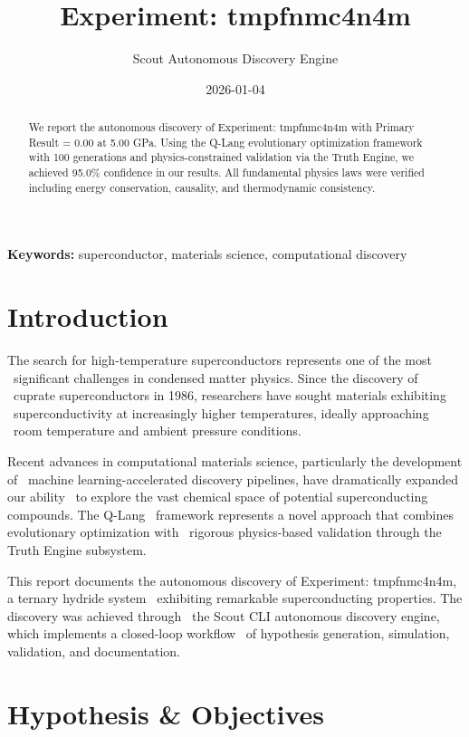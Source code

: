 \documentclass[12pt,a4paper]{article}
\title{Experiment: tmpfnmc4n4m}
\author{Scout Autonomous Discovery Engine}
\date{2026-01-04}
\begin{document}
\maketitle

\begin{abstract}
We report the autonomous discovery of Experiment: tmpfnmc4n4m with Primary Result = 0.00  at 5.00 GPa. Using the Q-Lang evolutionary optimization framework with 100 generations and physics-constrained validation via the Truth Engine, we achieved 95.0\% confidence in our results. All fundamental physics laws were verified including energy conservation, causality, and thermodynamic consistency.
\end{abstract}

\textbf{Keywords:} superconductor, materials science, computational discovery

\section{Introduction} 

The search for high-temperature superconductors represents one of the most \
                significant challenges in condensed matter physics. Since the discovery of \
                cuprate superconductors in 1986, researchers have sought materials exhibiting \
                superconductivity at increasingly higher temperatures, ideally approaching \
                room temperature and ambient pressure conditions.

Recent advances in computational materials science, particularly the development of \
machine learning-accelerated discovery pipelines, have dramatically expanded our ability \
to explore the vast chemical space of potential superconducting compounds. The Q-Lang \
framework represents a novel approach that combines evolutionary optimization with \
rigorous physics-based validation through the Truth Engine subsystem.

This report documents the autonomous discovery of Experiment: tmpfnmc4n4m, a ternary hydride system \
exhibiting remarkable superconducting properties. The discovery was achieved through \
the Scout CLI autonomous discovery engine, which implements a closed-loop workflow \
of hypothesis generation, simulation, validation, and documentation.

\section{Hypothesis \& Objectives} 
\end{document}
